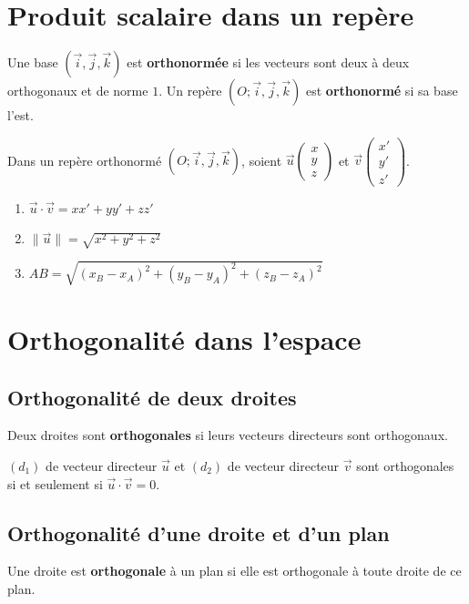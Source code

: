 \documentclass[11pt,a4paper,openany]{book}
\theoremstyle{definition}
\newcommand{\oijk}{(O;\vc{i},\vc{j},\vc{k})}
\newcommand{\vc}[1]{\overrightarrow{#1}}
\newcommand{\vcb}[3]{
    \left(\begin{array}{c}
        #1\\
        #2\\
        #3
    \end{array}\right)}
\begin{document}
    \section{Produit scalaire dans un repère}
    \begin{Définition}
        Une base $(\vc{i},\vc{j},\vc{k})$ est \textbf{orthonormée} si les vecteurs sont deux
        à deux orthogonaux et de norme $1$.
        Un repère $(O;\vc{i},\vc{j},\vc{k})$ est \textbf{orthonormé} si sa base l'est.
    \end{Définition}

    \begin{Propriété}
        Dans un repère orthonormé $\oijk$, soient $\vc{u}\vcb{x}{y}{z}$ et
        $\vc{v}\vcb{x'}{y'}{z'}$.
        \begin{enumerate}
            \item $\vc{u}\cdot\vc{v}=xx'+yy'+zz'$
            \item $\|\vc{u}\|=\sqrt{x^2+y^2+z^2}$
            \item $AB=\sqrt{(x_B-x_A)^2+(y_B-y_A)^2+(z_B-z_A)^2}$
        \end{enumerate}
    \end{Propriété}

    \section{Orthogonalité dans l'espace}
    \subsection{Orthogonalité de deux droites}
    \begin{Définition}
        Deux droites sont \textbf{orthogonales} si leurs vecteurs directeurs sont orthogonaux.
    \end{Définition}

    \begin{Propriété}
        $(d_1)$ de vecteur directeur $\vc{u}$ et $(d_2)$ de vecteur directeur $\vc{v}$ sont
        orthogonales si et seulement si $\vc{u}\cdot\vc{v}=0$.
    \end{Propriété}

    \subsection{Orthogonalité d'une droite et d'un plan}
    \begin{Définition}
        Une droite est \textbf{orthogonale} à un plan si elle est orthogonale à toute droite
        de ce plan.
    \end{Définition}
\end{document}

